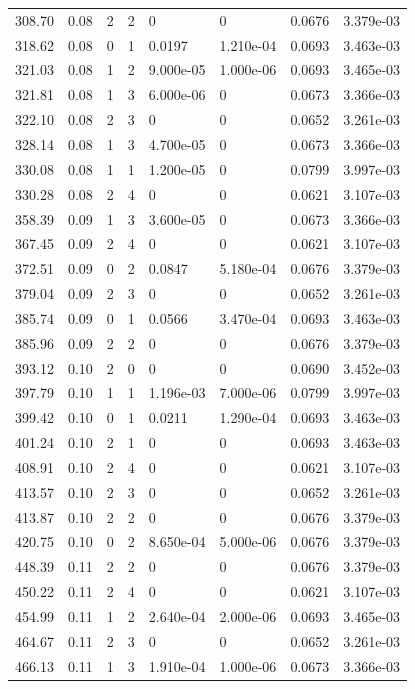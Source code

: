 \documentclass[preview]{standalone}
\begin{document}
{{{\begin{tabular}{L{1.2cm}C{1.2cm} C{0.3cm}C{0.5cm} C{1.4cm}C{1.4cm} C{1.4cm}C{1.4cm}}
  308.70  &  0.08  & 2     &  2 &  0  & 0  & 0.0676 &  3.379e-03   \\ 
  318.62  &  0.08  & 0     &  1 &  0.0197  & 1.210e-04  & 0.0693 &  3.463e-03   \\ 
  321.03  &  0.08  & 1     &  2 &  9.000e-05  & 1.000e-06  & 0.0693 &  3.465e-03   \\ 
  321.81  &  0.08  & 1     &  3 &  6.000e-06  & 0  & 0.0673 &  3.366e-03   \\ 
  322.10  &  0.08  & 2     &  3 &  0  & 0  & 0.0652 &  3.261e-03   \\ 
  328.14  &  0.08  & 1     &  3 &  4.700e-05  & 0  & 0.0673 &  3.366e-03   \\ 
  330.08  &  0.08  & 1     &  1 &  1.200e-05  & 0  & 0.0799 &  3.997e-03   \\ 
  330.28  &  0.08  & 2     &  4 &  0  & 0  & 0.0621 &  3.107e-03   \\ 
  358.39  &  0.09  & 1     &  3 &  3.600e-05  & 0  & 0.0673 &  3.366e-03   \\ 
  367.45  &  0.09  & 2     &  4 &  0  & 0  & 0.0621 &  3.107e-03   \\ 
  372.51  &  0.09  & 0     &  2 &  0.0847  & 5.180e-04  & 0.0676 &  3.379e-03   \\ 
  379.04  &  0.09  & 2     &  3 &  0  & 0  & 0.0652 &  3.261e-03   \\ 
  385.74  &  0.09  & 0     &  1 &  0.0566  & 3.470e-04  & 0.0693 &  3.463e-03   \\ 
  385.96  &  0.09  & 2     &  2 &  0  & 0  & 0.0676 &  3.379e-03   \\ 
  393.12  &  0.10  & 2     &  0 &  0  & 0  & 0.0690 &  3.452e-03   \\ 
  397.79  &  0.10  & 1     &  1 &  1.196e-03  & 7.000e-06  & 0.0799 &  3.997e-03   \\ 
  399.42  &  0.10  & 0     &  1 &  0.0211  & 1.290e-04  & 0.0693 &  3.463e-03   \\ 
  401.24  &  0.10  & 2     &  1 &  0  & 0  & 0.0693 &  3.463e-03   \\ 
  408.91  &  0.10  & 2     &  4 &  0  & 0  & 0.0621 &  3.107e-03   \\ 
  413.57  &  0.10  & 2     &  3 &  0  & 0  & 0.0652 &  3.261e-03   \\ 
  413.87  &  0.10  & 2     &  2 &  0  & 0  & 0.0676 &  3.379e-03   \\ 
  420.75  &  0.10  & 0     &  2 &  8.650e-04  & 5.000e-06  & 0.0676 &  3.379e-03   \\ 
  448.39  &  0.11  & 2     &  2 &  0  & 0  & 0.0676 &  3.379e-03   \\ 
  450.22  &  0.11  & 2     &  4 &  0  & 0  & 0.0621 &  3.107e-03   \\ 
  454.99  &  0.11  & 1     &  2 &  2.640e-04  & 2.000e-06  & 0.0693 &  3.465e-03   \\ 
  464.67  &  0.11  & 2     &  3 &  0  & 0  & 0.0652 &  3.261e-03   \\ 
  466.13  &  0.11  & 1     &  3 &  1.910e-04  & 1.000e-06  & 0.0673 &  3.366e-03   \\ 
\hline 
\end{tabular} 

}}}
\end{document}
